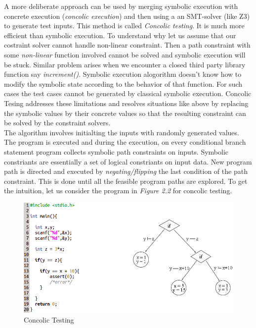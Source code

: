 \documentclass[12pt,oneside]{book}
\begin{document}
A more deliberate approach can be used by merging symbolic execution with concrete execution (\textit{concolic execution}) and then using a an SMT-solver (like Z3) to generate test inputs. This method is called \textit{Concolic testing}. It is much more efficient than symbolic execution. To understand why let us assume that our costraint solver cannot handle non-linear constraint. Then a path constraint with some \textit{non-linear} function involved cannot be solved and symbolic execution will be stuck. Similar problem arises when we encounter a closed third party library function say \textit{increment()}. Symbolic execution alogorithm doesn't know how to modify the symbolic state according to the behavior of that function. For such cases the test cases cannot be generated by classical symbolic execution. Concolic Tesing addresses these limitations and resolves situations like above by replacing the symbolic values by their concrete values so that the resulting constraint can be solved by the constraint solvers.\\

The algorithm involves initialting the inputs with randomly generated values. The program is executed and during the execution, on every conditional branch statement program collects symbolic path constraints on inputs. Symbolic constriants are essentially a set of logical constriants on input data. New program path is directed and executed by \textit{negating/flipping} the last condition of the path constraint. This is done until all the feasible program paths are explored. To get the intuition, let us consider the program in \textit{Figure 2.2} for concolic testing.  

\newpage

\begin{figure}[htbp]
\centering
\includegraphics[scale=0.5]{conjoined4.png}
\caption{Concolic Testing}
\end{figure}
\end{document}
